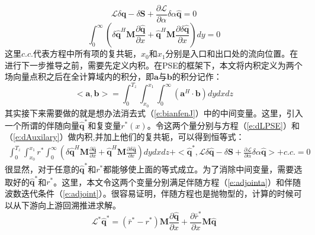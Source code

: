 \begin{equation}
\label{e:dLPSE}
\mathscr{L}\delta {\mathbf{\hat q}} - \delta {\mathbf{S}} + \frac{{\partial {\mathscr{L}}}}
{{\partial \alpha }}\delta \alpha {\mathbf{\hat q}} = 0
\end{equation}
\begin{equation}
\label{e:dAuxilary}
\int_0^\infty  {\left( {\delta {\mathbf{\hat q}}^H {\mathbf{M}}\frac{{\partial {\mathbf{\hat q}}}}
{{\partial x}} + {\mathbf{\hat q}}^H {\mathbf{M}}\frac{{\partial \delta {\mathbf{\hat q}}}}
{{\partial x}}} \right)dy}  = 0
\end{equation}
这里$c.c.$代表方程中所有项的复共轭，$x_0$和$x_1$分别是入口和出口处的流向位置。在进行下一步推导之前，需要先定义内积。在PSE的框架下，本文将内积定义为两个场向量点积之后在全计算域内的积分，即$\mathbf a$与$\mathbf b$的积分记作：
\begin{equation}
\label{e:innerproduct}
<\mathbf{a},\mathbf{b}>=\int_{0}^{T_z}\int_{x_0}^{x_1}\int_{0}^\infty (\mathbf{a}^H \cdot \mathbf{b})dydxdz
\end{equation}
其实接下来需要做的就是想办法消去式（\ref{e:bianfenJ}）中的中间变量。这里，引入一个所谓的伴随向量${\mathbf{\hat q}}^*$和复变量$r^*(x)$。令这两个量分别与方程（\ref{e:dLPSE}）和（\ref{e:dAuxilary}）做内积,并加上他们的复共轭，可以得到恒等式：
\begin{equation}
\label{e:dadjoint1}
\begin{aligned}
     \int_{0}^{T_z} {\int_{x_0}^{x_1}{r^* \int_0^\infty  {\left( {\delta {\mathbf{\hat q}}^H {\mathbf{M}}\frac{{\partial {\mathbf{\hat q}}}}{{\partial x}} + {\mathbf{\hat q}}^H {\mathbf{M}}\frac{{\partial \delta {\mathbf{\hat q}}}}{{\partial x}}} \right)dydxdz} } }%
     +<{\mathbf{\hat q}}^*,{\mathscr{L}}\delta {\mathbf{\hat q}}-\delta {\mathbf{S}} + \frac{{\partial {\mathscr{L}}}}{{\partial \alpha }}\delta \alpha {\mathbf{\hat q}} > + c.c. = 0
\end{aligned}
\end{equation}
很显然，对于任意的$\mathbf{\hat q}^*$和$r^*$都能够使上面的等式成立。为了消除中间变量，需要选取好的$\mathbf{\hat q}^*$和$r^*$。这里，本文令这两个变量分别满足伴随方程（\ref{e:adjointa}）和伴随波数迭代条件（\ref{e:adjoint}）。很容易证明，伴随方程也是抛物型的，计算的时候可以从下游向上游回溯推进求解。
\begin{equation}
\label{e:adjoint}
\mathscr{L}^* {\mathbf{\hat q}}^*  = \left( {\bar r^*  - r^* } \right){\mathbf{M}}\frac{{\partial {\mathbf{\hat q}}}}
{{\partial x}} + \frac{{\partial \bar r^* }}
{{\partial x}}{\mathbf{M\hat q}}
\end{equation}
